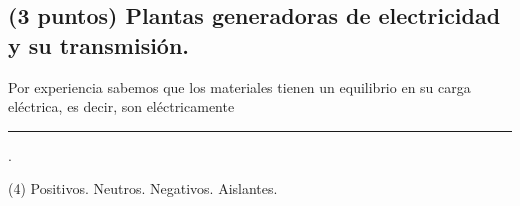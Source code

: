 \documentclass[12pt, letter]{exam}
\begin{document}
\begin{questions}
    \section{(3 puntos) Plantas generadoras de electricidad y su transmisión.}

    \question Por experiencia sabemos que los materiales tienen un equilibrio en su carga eléctrica, es decir, son eléctricamente \rule{2cm}{0.1mm}.
    \begin{tasks}(4)
        \task Positivos.
        \task Neutros.
        \task Negativos.
        \task Aislantes.
    \end{tasks}


\end{questions}
\end{document}
